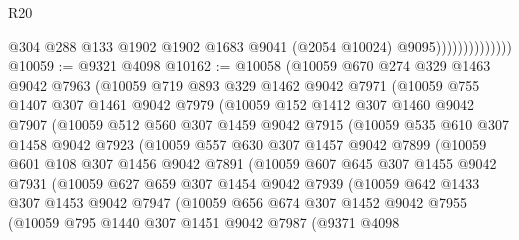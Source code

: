\begin{lexlean}{R20}
\begin{coremodule}
                                @304
                                @288
                                @133
                                @1902
                                @1902
                                @1683
                                @9041
                                (@2054 @10024)
                                @9095))))))))))))))
@10059 := @9321 @4098
@10162 := @10058
    (@10059
      @670
      @274
      @329
      @1463
      @9042
      @7963
      (@10059
        @719
        @893
        @329
        @1462
        @9042
        @7971
        (@10059
          @755
          @1407
          @307
          @1461
          @9042
          @7979
          (@10059
            @152
            @1412
            @307
            @1460
            @9042
            @7907
            (@10059
              @512
              @560
              @307
              @1459
              @9042
              @7915
              (@10059
                @535
                @610
                @307
                @1458
                @9042
                @7923
                (@10059
                  @557
                  @630
                  @307
                  @1457
                  @9042
                  @7899
                  (@10059
                    @601
                    @108
                    @307
                    @1456
                    @9042
                    @7891
                    (@10059
                      @607
                      @645
                      @307
                      @1455
                      @9042
                      @7931
                      (@10059
                        @627
                        @659
                        @307
                        @1454
                        @9042
                        @7939
                        (@10059
                          @642
                          @1433
                          @307
                          @1453
                          @9042
                          @7947
                          (@10059
                            @656
                            @674
                            @307
                            @1452
                            @9042
                            @7955
                            (@10059
                              @795
                              @1440
                              @307
                              @1451
                              @9042
                              @7987
                              (@9371
                                @4098

\end{coremodule}
\end{lexlean}
